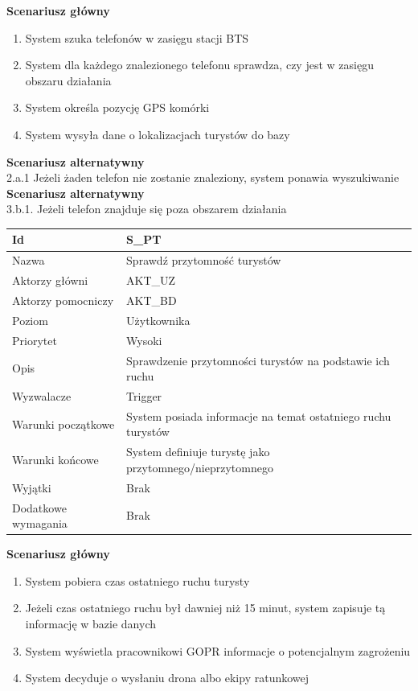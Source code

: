 \documentclass[a4paper,12pt]{article}
\begin{document}
\textbf{Scenariusz główny}
\begin{enumerate}
\item System szuka telefonów w zasięgu stacji BTS
\item System dla każdego znalezionego telefonu sprawdza, czy jest w zasięgu obszaru działania
\item System określa pozycję GPS komórki
\item System wysyła dane o lokalizacjach turystów do bazy
\end{enumerate}
\textbf{Scenariusz alternatywny} \\
2.a.1 Jeżeli żaden telefon nie zostanie znaleziony, system ponawia wyszukiwanie\\
\textbf{Scenariusz alternatywny}\\
3.b.1. Jeżeli telefon znajduje się poza obszarem działania
\newpage
\begin{longtable}{| p{5cm} | p{10cm} |}
\hline
Id & S\_PT \\\hline
Nazwa & Sprawdź przytomność turystów \\\hline
Aktorzy główni & AKT\_UZ \\\hline
Aktorzy pomocniczy & AKT\_BD \\\hline
Poziom & Użytkownika \\\hline
Priorytet & Wysoki \\\hline
Opis & Sprawdzenie przytomności turystów na podstawie ich ruchu \\\hline
Wyzwalacze & Trigger \\\hline
Warunki początkowe & System posiada informacje na temat ostatniego ruchu turystów \\\hline
Warunki końcowe & System definiuje turystę jako przytomnego/nieprzytomnego \\\hline
Wyjątki & Brak \\\hline
Dodatkowe wymagania & Brak \\\hline
\end{longtable}
\textbf{Scenariusz główny}
\begin{enumerate}
\item System pobiera czas ostatniego ruchu turysty
\item Jeżeli czas ostatniego ruchu był dawniej niż 15 minut, system zapisuje tą informację w bazie danych
\item System wyświetla pracownikowi GOPR informacje o potencjalnym zagrożeniu
\item System decyduje o wysłaniu drona albo ekipy ratunkowej
\end{enumerate}
\end{document}
